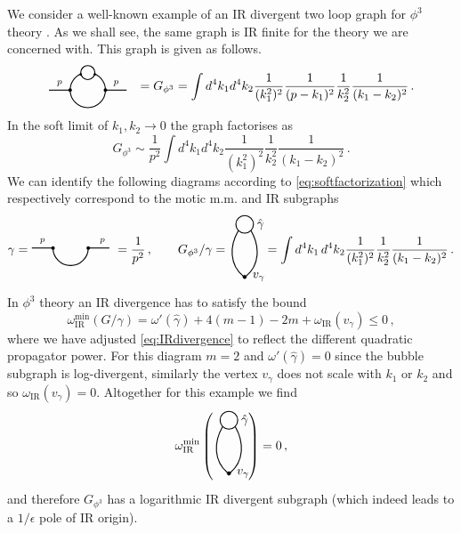 \documentclass[a4paper,11pt]{article}
\newcommand{\BubbleGraph}{
\begin{minipage}{2.5cm}
\begin{tikzpicture}
\draw[ thick, -] (0.5,0) arc[start angle=0, end angle=-180,radius=0.5];
\draw[ thick, -] (-0.5,0) -- (-1.1,0);
\draw[ thick, -] (0.5,0) -- (1.1,0);
\draw (0.8,0.2) node{${\scriptstyle {p}}$};
\draw (-0.8,0.2) node{${\scriptstyle {p}}$};
\fill[ thick, -] (0.5,0) circle (0.05);
\fill[ thick, -] (-0.5,0) circle (0.05);

\draw[ thick, -] (0,0.5) circle (0.2);

\draw[ thick, -] (-0.5,0) arc[start angle=180, end angle=112, radius=0.5];
\fill[ thick, -] (0.2,0.45) circle (0.035);
\fill[ thick, -] (-0.2,0.45) circle (0.035);
\draw[ thick, -] (0.5,0) arc[start angle=0, end angle=68, radius=0.5];
\end{tikzpicture}
\end{minipage}
}
\newcommand{\GsubGEx}{
\begin{minipage}{1cm}
\begin{tikzpicture}
\draw[ thick, -] (0,0) circle (0.25) ;
\draw[fill=black] (0,-1.5) circle (0.05) ;
\node at (0.45,0) {$\hat{\gamma}$};
\node at (0.4,-1.5) {$v_{\gamma}$};
\draw[ thick, -] (0.18,-0.18) to[out=-60,in=40] (0.04,-1.48);
\draw[ thick, -] (-0.18,-0.18) to[out=-120,in=140] (-0.04,-1.48);
\end{tikzpicture}
\end{minipage}
}
\newcommand{\GamEx}{
\begin{minipage}{2cm}
\begin{tikzpicture}
\draw[ thick, -] (0.4,0) arc[start angle=0, end angle=-180,radius=0.5];
\draw[ thick, -] (-0.6,0) -- (-1.2,0);
\draw[ thick, -] (0.4,0) -- (1,0);
\draw (0.8,0.2) node{${\scriptstyle {p}}$};
\draw (-0.9,0.2) node{${\scriptstyle {p}}$};
\fill[ thick, -] (0.4,0) circle (0.05);
\fill[ thick, -] (-0.6,0) circle (0.05);
\end{tikzpicture}
\end{minipage}
}
\begin{document}
We consider a well-known example of an IR divergent two loop graph for $\phi^3$ theory \cite{Larin:2002sc}. As we shall see, the same graph is IR finite for the theory we are concerned with. This graph is given as follows.
    \begin{equation}
        \BubbleGraph  = G_{\phi^3} = \int d^4k_1d^4k_2 \frac{1}{(k_1^2)^2} \frac{1}{(p-k_1)^2} \frac{1}{k_2^2} \frac{1}{(k_1 - k_2)^2} \,.
    \end{equation}
In the soft limit of $k_1,k_2\to 0$ the graph factorises as
\begin{equation}
    G_{\phi^3}  \sim \frac{1}{p^2}\int d^4k_1d^4k_2 \frac{1}{(k_1^2)^2}  \frac{1}{k_2^2} \frac{1}{(k_1 - k_2)^2} \,.
\end{equation}
We can identify the following diagrams according to \cref{eq:softfactorization} which respectively correspond to the motic m.m. and IR subgraphs 
\begin{equation}
   \gamma =  \GamEx \quad = \frac{1}{p^2}  \,, \qquad  G_{\phi^3}/\gamma =   \GsubGEx  = \int d^4k_1 \, d^4k_2  \frac{1}{(k_1^2)^2} \frac{1}{k_2^2} \frac{1}{(k_1 - k_2)^2}  \,.
\end{equation}
In $\phi^3$ theory an IR divergence has to satisfy the bound 
\begin{equation}
    {\omega}_{\mathrm{IR}}^{\mathrm{min}} \left( G/\gamma  \right) = {\omega}'(\hat{\gamma}) + 4(m-1) - 2m + \omega_{\mathrm{IR}}(v_\gamma) \leq 0 \,,
\end{equation}
where we have adjusted \cref{eq:IRdivergence} to reflect the different quadratic propagator power. For this diagram $m=2$ and ${\omega}'(\hat{\gamma}) = 0$ since the bubble subgraph is log-divergent, similarly the vertex $v_\gamma$ does not scale with $k_1$ or $k_2$ and so $\omega_{\mathrm{IR}}(v_\gamma)=0$. Altogether for this example we find
\begin{equation}
  {\omega}_{\mathrm{IR}}^{\mathrm{min}}\left(  \GsubGEx \right) = 0  \,,
\end{equation}
and therefore $G_{\phi^3}$ has a logarithmic IR divergent subgraph (which indeed leads to a $1/\epsilon$ pole of IR origin).  
\end{document}
